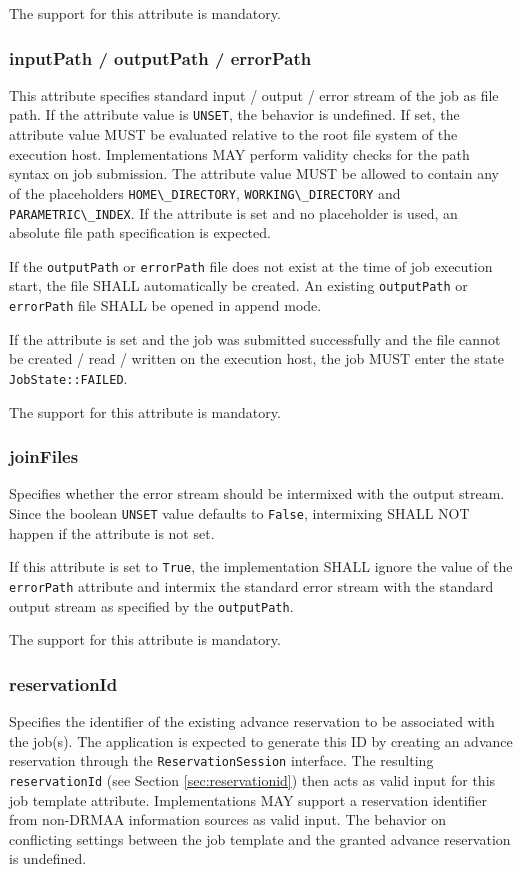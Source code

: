 \documentclass{article}
\newcommand{\h}[1]{\lstinline|#1|}
\begin{document}
The support for this attribute is mandatory.

\subsubsection{inputPath / outputPath / errorPath}

This attribute specifies standard input / output / error stream of the job as file path. If the attribute value is \h{UNSET}, the behavior is undefined. If set, the attribute value MUST be evaluated relative to the root file system of the execution host. Implementations MAY perform validity checks for the path syntax on job submission. The attribute value MUST be allowed to contain any of the placeholders \h{HOME\_DIRECTORY}, \h{WORKING\_DIRECTORY} and \h{PARAMETRIC\_INDEX}. If the attribute is set and no placeholder is used, an absolute file path specification is expected. 

If the \h{outputPath} or \h{errorPath} file does not exist at the time of job execution start, the file SHALL automatically be created. An existing \h{outputPath} or \h{errorPath} file SHALL be opened in append mode.

If the attribute is set and the job was submitted successfully and the file cannot be created / read / written on the execution host, the job MUST enter the state \h{JobState::FAILED}.

The support for this attribute is mandatory.

\subsubsection{joinFiles}

Specifies whether the error stream should be intermixed with the output stream. Since the boolean \h{UNSET} value defaults to \h{False}, intermixing SHALL NOT happen if the attribute is not set. 

If this attribute is set to \h{True}, the implementation SHALL ignore the value of the \h{errorPath} attribute and intermix the standard error stream with the standard output stream as specified by the \h{outputPath}.

The support for this attribute is mandatory.

\subsubsection{reservationId}

Specifies the identifier of the existing advance reservation to be associated with the job(s). The application is expected to generate this ID by creating an advance reservation through the \h{ReservationSession} interface. The resulting \h{reservationId} (see Section \ref{sec:reservationid}) then acts as valid input for this job template attribute. Implementations MAY support a reservation identifier from non-DRMAA information sources as valid input. The behavior on conflicting settings between the job template and the granted advance reservation is undefined.
\end{document}
